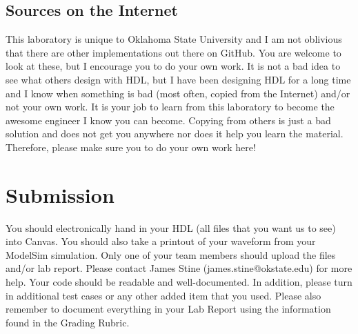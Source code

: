 \documentclass{article}
\begin{document}
\subsection{Sources on the Internet}

This laboratory is unique to Oklahoma State University and I am not
oblivious that there are other implementations out there on GitHub.
You are welcome to look at these, but I encourage you to do your own
work.  It is not a bad idea to see what others design with HDL, but I
have been
designing HDL for a long time and I know when something is bad (most
often, copied from the Internet) and/or not your own work.  It is your job
to learn from this laboratory to become the awesome engineer I know
you can become.  Copying from others is just a bad solution and does
not get you anywhere nor does it help you learn the material.
Therefore, please make sure you to do your own
work here!


\section{Submission}

You should electronically hand in your HDL (all files that you want
us to see) into Canvas.  You should also take a printout of your waveform 
from your ModelSim simulation.  Only one of your team members should upload
the files and/or lab report. Please contact James Stine
(james.stine@okstate.edu) 
for more help.  Your code should be
readable and well-documented. In addition, please turn in additional
test cases or any other added item that you used. 
Please also remember to document everything in your Lab Report using
the information found in the Grading Rubric.


    


\end{document}
